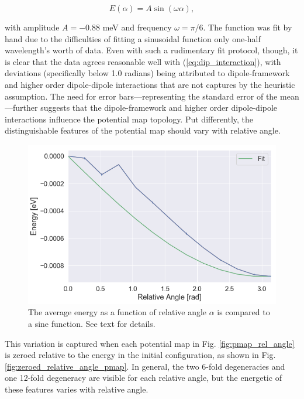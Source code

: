         \begin{equation}
            E(\alpha) = A \sin(\omega \alpha),
        \end{equation}
        
        \noindet with amplitude $A = -0.88$ meV and frequency $\omega = \pi/6$. The function was fit by hand due to the difficulties of fitting a sinusoidal function only one-half wavelength's worth of data. Even with such a rudimentary fit protocol, though, it is clear that the data agrees reasonable well with (\ref{eq:dip_interaction}), with deviations (specifically below 1.0 radians) being attributed to dipole-framework and higher order dipole-dipole interactions that are not captures by the heuristic assumption. The need for error bars---representing the standard error of the mean---further suggests that the dipole-framework and higher order dipole-dipole interactions influence the potential map topology. Put differently, the distinguishable features of the potential map should vary with relative angle.
        
        \begin{figure}
            \centering
            \includegraphics[width=0.9\linewidth]{Figures/System/relative_angle_fit.png}
            \caption{The average energy as a function of relative angle $\alpha$ is compared to a sine function. See text for details.}
            \label{fig:relative_angle_fit}
        \end{figure}
        
        This variation is captured when each potential map in Fig. \ref{fig:pmap_rel_angle} is zeroed relative to the energy in the initial configuration, as shown in Fig. \ref{fig:zeroed_relative_angle_pmap}. In general, the two 6-fold degeneracies and one 12-fold degeneracy are visible for each relative angle, but the energetic of these features varies with relative angle. 
        
